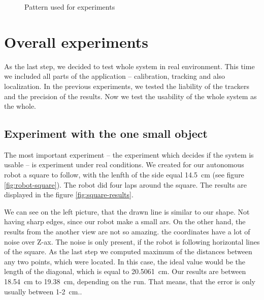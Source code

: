 \begin{figure}
\centering
{}
\caption{Pattern used for experiments}
\label{fig:grid}
\end{figure}

\section{Overall experiments}

As the last step, we decided to test whole system in real environment. This
time we included all parts of the application -- calibration, tracking and also
localization. In the previous experiments, we tested the liability of the
trackers and the precision of the results. Now we test the usability of the
whole system as the whole.

\subsection{Experiment with the one small object}

The most important experiment -- the experiment which decides if the system is
usable -- is experiment under real conditions. We created for our autonomous
robot a square to follow, with the lenfth of the side equal 14.5~cm (see figure
\ref{fig:robot-square}). The robot did four laps around the square. The
results are displayed in the figure \ref{fig:square-results}.

We can see on the left picture, that the drawn line is similar to our shape.
Not having sharp edges, since our robot make a small ars. On the other hand,
the results from the another view are not so amazing. the coordinates have a
lot of noise over Z-ax. The noise is only present, if the robot is following
horizontal lines of the square. As the last step we computed maximum of the
distances between any two points, which were located. In this case, the ideal
value would be the length of the diagonal, which is equal to 20.5061~cm. Our
results are between 18.54~cm to 19.38~cm, depending on the run. That means,
that the error is only usually between 1-2~cm..

